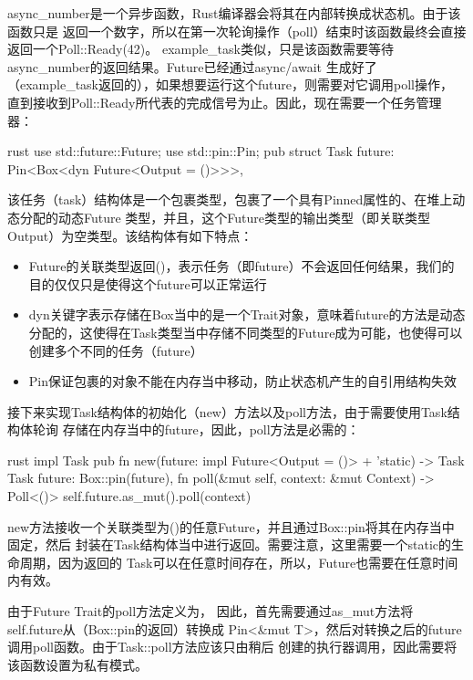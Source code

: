 async\_number是一个异步函数，Rust编译器会将其在内部转换成状态机。由于该函数只是
返回一个数字，所以在第一次轮询操作（poll）结束时该函数最终会直接返回一个Poll::Ready(42)。
example\_task类似，只是该函数需要等待async\_number的返回结果。Future已经通过async/await
生成好了（example\_task返回的），如果想要运行这个future，则需要对它调用poll操作，
直到接收到Poll::Ready所代表的完成信号为止。因此，现在需要一个任务管理器：
\begin{code-block}{rust}
use std::future::Future;
use std::pin::Pin;
pub struct Task {
    future: Pin<Box<dyn Future<Output = ()>>>,
}
\end{code-block}
该任务（task）结构体是一个包裹类型，包裹了一个具有Pinned属性的、在堆上动态分配的动态Future
类型，并且，这个Future类型的输出类型（即关联类型Output）为空类型。该结构体有如下特点：
\begin{itemize}
  \item Future的关联类型返回()，表示任务（即future）不会返回任何结果，我们的目的仅仅只是使得这个future可以正常运行
  \item dyn关键字表示存储在Box当中的是一个Trait对象，意味着future的方法是动态分配的，这使得在Task类型当中存储不同类型的Future成为可能，也使得可以创建多个不同的任务（future）
  \item Pin保证包裹的对象不能在内存当中移动，防止状态机产生的自引用结构失效
\end{itemize}

接下来实现Task结构体的初始化（new）方法以及poll方法，由于需要使用Task结构体轮询
存储在内存当中的future，因此，poll方法是必需的：
\begin{code-block}{rust}
impl Task {
    pub fn new(future: impl Future<Output = ()> + 'static) -> Task {
        Task {
            future: Box::pin(future),
        }
    }
    fn poll(&mut self, context: &mut Context) -> Poll<()> {
        self.future.as_mut().poll(context)
    }
}
\end{code-block}
new方法接收一个关联类型为()的任意Future，并且通过Box::pin将其在内存当中固定，然后
封装在Task结构体当中进行返回。需要注意，这里需要一个static的生命周期，因为返回的
Task可以在任意时间存在，所以，Future也需要在任意时间内有效。

由于Future Trait的poll方法定义为，
因此，首先需要通过as\_mut方法将self.future从（Box::pin的返回）转换成
Pin<\&mut T>，然后对转换之后的future调用poll函数。由于Task::poll方法应该只由稍后
创建的执行器调用，因此需要将该函数设置为私有模式。

